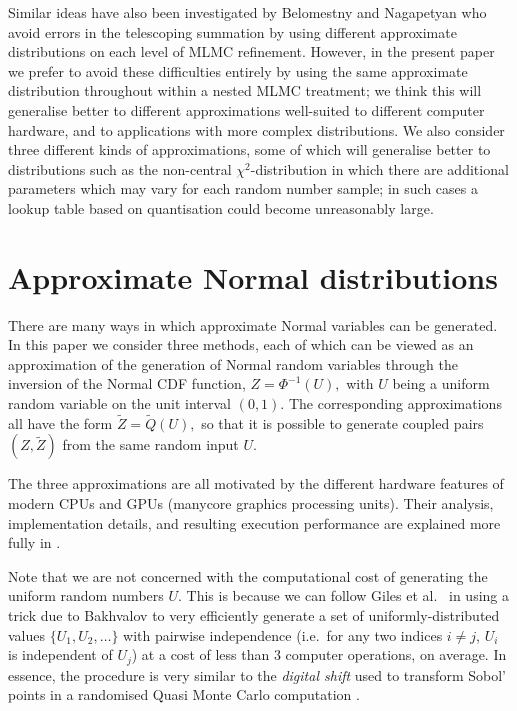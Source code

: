 \documentclass[review]{siamart190516}
\def \tQ {{\widetilde{Q}}}
\def \tZ {{\widetilde{Z}}}
\begin{document}
Similar ideas have also been investigated by Belomestny and Nagapetyan \cite{bn17}
who avoid errors in the telescoping summation by using different approximate
distributions on each level of MLMC refinement.  However, in the present paper
we prefer to avoid these difficulties entirely by using the same approximate
distribution throughout within a nested MLMC treatment; we think this will
generalise better to different approximations well-suited to different
computer hardware, and to applications with more complex distributions.
We also consider three different kinds of approximations, some of which
will generalise better to distributions such as the non-central
$\chi^2$-distribution in which there are additional parameters which may
vary for each random number sample; in such cases a lookup table based
on quantisation could become unreasonably large. 

\section{Approximate Normal distributions}

\label{sec:approximations}

There are many ways in which approximate Normal variables can be generated.
In this paper we consider three methods, each of which can be viewed as an
approximation of the generation of Normal random variables
through the inversion of the Normal CDF function,
$\displaystyle
Z = \Phi^{-1}(U),
$
with $U$ being a uniform random variable on the unit interval $(0,1)$.
The corresponding approximations all have the form
$\displaystyle
\tZ = \tQ(U),
$
so that it is possible to generate coupled pairs $(Z,\tZ)$ 
from the same random input $U$.

The three approximations are all motivated by the different hardware features 
of modern CPUs and GPUs (manycore graphics processing units). Their analysis, 
implementation details, and resulting execution performance are explained more fully in \cite{sheridanmethven2020approximating,sheridan-methven2020thesis}.

Note that we are not concerned with the computational cost of generating the 
uniform random numbers $U$.  This is because we can follow 
Giles et al.~\cite{ghmr19b} in using a trick due to 
Bakhvalov \cite{bakhvalov64} to very efficiently 
generate a set of uniformly-distributed values $\{ U_1, U_2, \ldots\}$ 
with pairwise independence (i.e.~for any two indices $i\neq j$, $U_i$ 
is independent of $U_j$) at a cost of less than 3 computer operations, 
on average.
In essence, the procedure is very similar to the \emph{digital shift} 
used to transform Sobol' points in a randomised Quasi Monte Carlo 
computation \cite{ecuyer2016randomized}.
\end{document}

